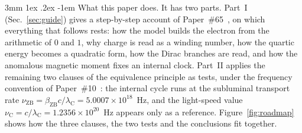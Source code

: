 \documentclass[%
 reprint, amsmath,amssymb, aps, prb, ]{revtex4-2}
\makeatletter
\numberwithin{equation}{section}
\renewcommand\paragraph{%
  \@startsection{paragraph}{4}{\z@}%
    {3mm \@plus 1ex \@minus .2ex}%
    {-1em}%
    {\normalfont\normalsize\itshape}}
\newcommand{\betaZB}{\beta_{\text{ZB}}}
\newcommand{\lambdaC}{\lambda_{\text{C}}}
\newcommand{\nuZB}{\nu_{\text{ZB}}}
\newcommand{\nuC}{\nu_{\text{C}}}
\makeatother
\begin{document}
\paragraph{What this paper does.} It has two parts. Part~I (Sec.~\ref{sec:guide}) gives a step-by-step account of Paper~\#65~\cite{hanamura65}, on which everything that follows rests: how the model builds the electron from the arithmetic of $0$ and $1$, why charge is read as a winding number, how the quartic energy becomes a quadratic form, how the Dirac branches are read, and how the anomalous magnetic moment fixes an internal clock. Part~II applies the remaining two clauses of the equivalence principle as tests, under the frequency convention of Paper~\#10~\cite{hanamura10}: the internal cycle runs at the subluminal transport rate $\nuZB = \betaZB c/\lambdaC = 5.0007\times10^{18}$~Hz, and the light-speed value $\nuC = c/\lambdaC = 1.2356\times10^{20}$~Hz appears only as a reference. Figure~\ref{fig:roadmap} shows how the three clauses, the two tests and the conclusions fit together.
\end{document}
